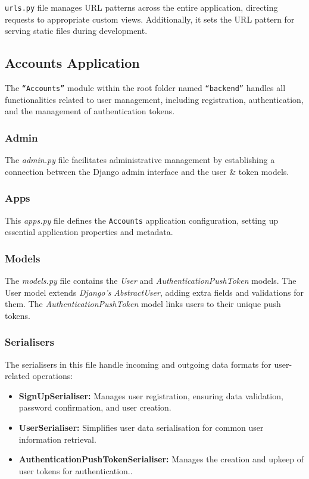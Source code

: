 \texttt{urls.py} file manages URL patterns across the entire application, directing requests to appropriate custom views. Additionally, it sets the URL pattern for serving static files during development.

\subsection{Accounts Application}

The \texttt{``Accounts''} module within the root folder named \texttt{``backend''} handles all functionalities related to user management, including registration, authentication, and the management of authentication tokens.

\subsubsection{Admin} 

The \textit{admin.py} file facilitates administrative management by establishing a connection between the Django admin interface and the user \& token models.

\subsubsection{Apps} 

This \textit{apps.py} file defines the \texttt{Accounts} application configuration, setting up essential application properties and metadata.

\subsubsection{Models} 

The \textit{models.py} file contains the \textit{User} and \textit{AuthenticationPushToken} models. The User model extends \textit{Django's} \textit{AbstractUser}, adding extra fields and validations for them. The \textit{AuthenticationPushToken} model links users to their unique push tokens.

\subsubsection{Serialisers}

The serialisers in this file handle incoming and outgoing data formats for user-related operations:

\begin{itemize}
    \item \textbf{SignUpSerialiser:} Manages user registration, ensuring data validation, password confirmation, and user creation.
    \item \textbf{UserSerialiser:} Simplifies user data serialisation for common user information retrieval.
    \item \textbf{AuthenticationPushTokenSerialiser:} Manages the creation and upkeep of user tokens for authentication..
\end{itemize}

